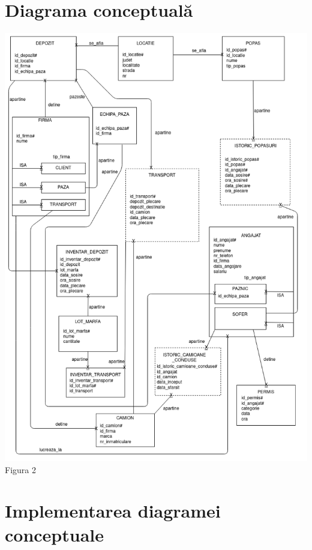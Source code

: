 \documentclass[12pt, a4paper]{article}
\begin{document}
\justify

\section{Diagrama conceptuală}
\includegraphics[width=\textwidth]{_diagrama_conceptuala.png}
\label{Figura 2}
\centering Figura 2

\justify

\section{Implementarea diagramei conceptuale}
\end{document}
